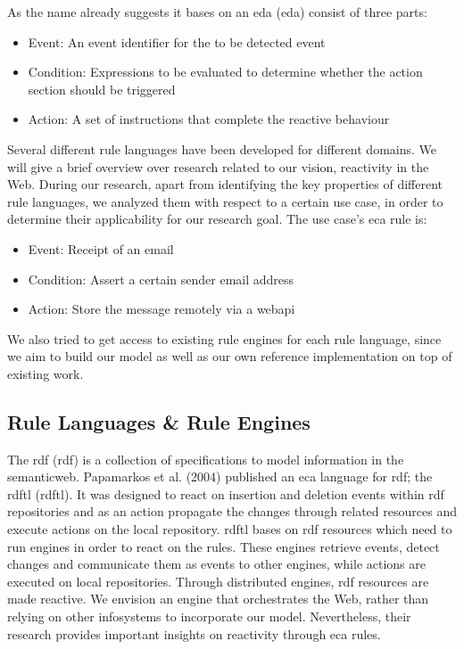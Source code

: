 As the name already suggests it bases on an \textrm{\acrlong{eda} (\acrshort{eda})} consist of three parts:
\begin{itemize}
  \item Event: An event identifier for the to be detected event
  \item Condition: Expressions to be evaluated to determine whether the action section should be triggered
  \item Action: A set of instructions that complete the reactive behaviour
\end{itemize}

Several different rule languages have been developed for different domains.
We will give a brief overview over research related to our vision, reactivity in the Web.
During our research, apart from identifying the key properties of different rule languages, we analyzed them with respect to a certain use case, in order to determine their applicability for our research goal.
The use case's \textrm{\acrshort{eca}} rule is:
\begin{itemize}
  \item Event: Receipt of an email
  \item Condition: Assert a certain sender email address
  \item Action: Store the message remotely via a \textrm{\gls{webapi}}
\end{itemize}
We also tried to get access to existing rule engines for each rule language, since we aim to build our model as well as our own reference implementation on top of existing work.


\subsection{Rule Languages \& Rule Engines}
The \textrm{\acrlong{rdf} (\acrshort{rdf})} is a collection of specifications to model information in the \textrm{\gls{semanticweb}}.
Papamarkos et al. (2004) published an \textrm{\acrshort{eca}} language for \textrm{\acrshort{rdf}}; the \textrm{\acrlong{rdftl} (\acrshort{rdftl})}.
It was designed to react on insertion and deletion events within \textrm{\acrshort{rdf}} repositories and as an action propagate the changes through related resources and execute actions on the local repository.
\textrm{\acrshort{rdftl}} bases on \textrm{\acrshort{rdf}} resources which need to run engines in order to react on the rules.
These engines retrieve events, detect changes and communicate them as events to other engines, while actions are executed on local repositories.
Through distributed engines, \textrm{\acrshort{rdf}} resources are made reactive.
We envision an engine that orchestrates the Web, rather than relying on other \textrm{\glspl{infosystem}} to incorporate our model.
Nevertheless, their research provides important insights on reactivity through \textrm{\acrshort{eca}} rules.


